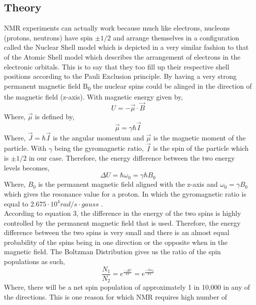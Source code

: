 \documentclass{article}
\begin{document}
{\begin{multicols}{2}
\section{Theory}
NMR experiments can actually work because much like electrons, nucleons 
(protons, neutrons) have spin $\pm1/2$ and arrange themselves in 
a configuration called the Nuclear Shell model which is depicted in a very 
similar fashion to that of the Atomic Shell model which describes the 
arrangement 
of electrons in the electronic orbitals. This is to say that they too fill up 
their 
respective shell positions according to the Pauli Exclusion principle. By 
having a very strong permanent magnetic field B\textsubscript{0} the nuclear 
spins could be alinged in the direction of the magnetic field (z-axis). With 
magnetic energy given by,
\begin{equation} %
U = -\vec{\mu}\cdot\vec{B}
\end{equation}
Where, $\vec{\mu}$ is defined by,
\begin{equation} %
\vec{\mu} = \gamma\hbar\vec{I}
\end{equation}
Where, $\vec{J} = \hbar\vec{I}$ is the angular momentum and $\vec{\mu}$ is the 
magnetic moment of the particle. With $\gamma$ being the gyromagnetic ratio, 
$\vec{I}$ is the spin of the particle which is $\pm1/2$ in our case. Therefore, 
the energy difference between the two energy levels becomes,
\begin{equation} %
\Delta U = \hbar\omega_0 = \gamma\hbar B_0
\end{equation}
Where, $B_0$ is the permanent magnetic field aligned with the z-axis and 
$\omega_0 = \gamma B_0$ which gives the resonance value for a proton. In which 
the gyromagnetic ratio is equal to $2.675 \cdot 10^4 rad/s\cdot gauss$
\cite{ref:2}.
\\
According to equation 3, the difference in the energy of the two spins is 
highly controlled by the permanent magnetic field that is used. Therefore, the 
energy difference between the two spins is very small and there is an almost 
equal probability of the spins being in one direction or the opposite when in 
the magnetic field. The Boltzman Distribution gives us the ratio of the spin 
populations as such,
\begin{equation}
\frac{N_1}{N_2} = e^{\frac{-\Delta U}{kT}} = e^{\frac{-h\omega_0}{kT}}
\end{equation}
Where, there will be a net spin population of approximately 1 in 10,000 in any 
of the directions. This is one reason for which NMR requires high number of 

\end{multicols}}
\end{document}
